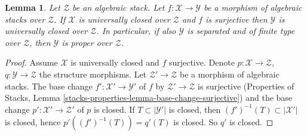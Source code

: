 \documentclass[10pt,a4paper]{amsart}
\theoremstyle{plain}
\newtheorem{lemma}[subsection]{Lemma}
\theoremstyle{definition}
\theoremstyle{remark}
\numberwithin{equation}{subsection}
\begin{document}
\begin{lemma}
\label{lemma-image-proper-is-proper}
Let $\mathcal{Z}$ be an algebraic stack.
Let $f : \mathcal{X} \to \mathcal{Y}$
be a morphism of algebraic stacks over $\mathcal{Z}$.
If $\mathcal{X}$ is universally closed over $\mathcal{Z}$
and $f$ is surjective then $\mathcal{Y}$
is universally closed over $\mathcal{Z}$.
In particular, if also $\mathcal{Y}$ is
separated and of finite type over $\mathcal{Z}$,
then $\mathcal{Y}$ is proper over $\mathcal{Z}$.
\end{lemma}

\begin{proof}
Assume $\mathcal{X}$ is universally closed and $f$ surjective.
Denote $p : \mathcal{X} \to \mathcal{Z}$,
$q : \mathcal{Y} \to \mathcal{Z}$ the structure morphisms.
Let $\mathcal{Z}' \to \mathcal{Z}$ be a morphism of algebraic stacks.
The base change $f' : \mathcal{X}' \to \mathcal{Y}'$
of $f$ by $\mathcal{Z}' \to \mathcal{Z}$ is surjective
(Properties of Stacks, Lemma
\ref{stacks-properties-lemma-base-change-surjective}) and the base
change $p' : \mathcal{X}' \to \mathcal{Z}'$ of $p$ is closed.
If $T \subset |\mathcal{Y}'|$ is closed, then
$(f')^{-1}(T) \subset |\mathcal{X}'|$ is closed, hence
$p'((f')^{-1}(T)) = q'(T)$ is closed. So $q'$ is closed.
\end{proof}
\end{document}

